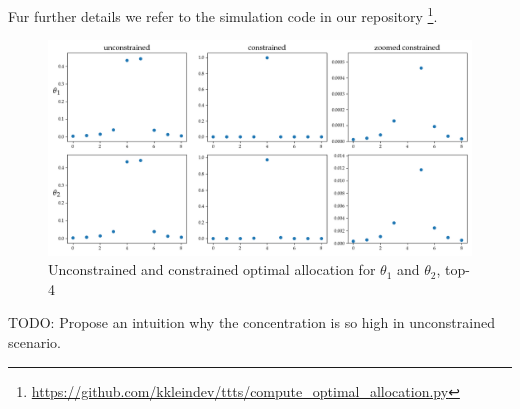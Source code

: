 Fur further details we refer to the simulation code in our repository \footnote{\url{https://github.com/kkleindev/ttts/compute_optimal_allocation.py}}.

\begin{figure}[h]
  \centering
  \includegraphics[width=\textwidth]{optimal_allocation.png}
  \caption{Unconstrained and constrained optimal allocation for $\theta_1$ and $\theta_2$, top-4}
  \label{fig:optimal_allocation}
\end{figure}

TODO: Propose an intuition why the concentration is so high in unconstrained scenario.

